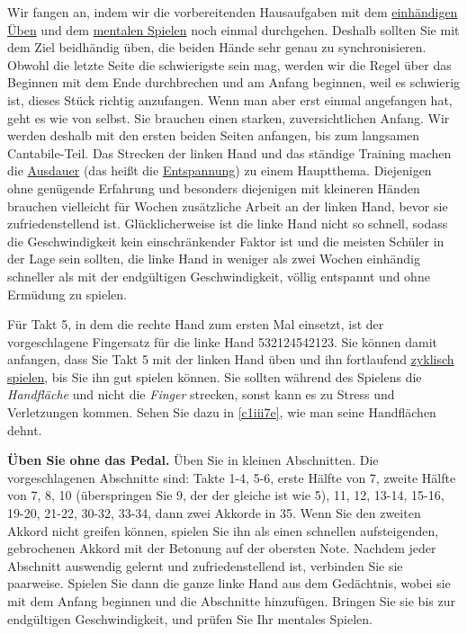 Wir fangen an, indem wir die vorbereitenden Hausaufgaben mit dem \hyperref[c1ii7]{einhändigen Üben} und dem \hyperref[c1ii12mental]{mentalen Spielen} noch einmal durchgehen.
Deshalb sollten Sie mit dem Ziel beidhändig üben, die beiden Hände sehr genau zu synchronisieren.
Obwohl die letzte Seite die schwierigste sein mag, werden wir die Regel über das Beginnen mit dem Ende durchbrechen und am Anfang beginnen, weil es schwierig ist, dieses Stück richtig anzufangen.
Wenn man aber erst einmal angefangen hat, geht es wie von selbst.
Sie brauchen einen starken, zuversichtlichen Anfang.
Wir werden deshalb mit den ersten beiden Seiten anfangen, bis zum langsamen Cantabile-Teil.
Das Strecken der linken Hand und das ständige Training machen die \hyperref[c1ii21]{Ausdauer} (das heißt die \hyperref[c1ii14]{Entspannung}) zu einem Hauptthema.
Diejenigen ohne genügende Erfahrung und besonders diejenigen mit kleineren Händen brauchen vielleicht für Wochen zusätzliche Arbeit an der linken Hand, bevor sie zufriedenstellend ist.
Glücklicherweise ist die linke Hand nicht so schnell, sodass die Geschwindigkeit kein einschränkender Faktor ist und die meisten Schüler in der Lage sein sollten, die linke Hand in weniger als zwei Wochen einhändig schneller als mit der endgültigen Geschwindigkeit, völlig entspannt und ohne Ermüdung zu spielen.

Für Takt 5, in dem die rechte Hand zum ersten Mal einsetzt, ist der vorgeschlagene Fingersatz für die linke Hand 532124542123.
Sie können damit anfangen, dass Sie Takt 5 mit der linken Hand üben und ihn fortlaufend \hyperref[c1iii2]{zyklisch spielen}, bis Sie ihn gut spielen können.
Sie sollten während des Spielens die \textit{Handfläche} und nicht die \textit{Finger} strecken, sonst kann es zu Stress und Verletzungen kommen.
Sehen Sie dazu in \hyperref[c1iii7e]{\ref*{c1iii7e}}, wie man seine Handflächen dehnt.

\textbf{Üben Sie ohne das Pedal.}
Üben Sie in kleinen Abschnitten.
Die vorgeschlagenen Abschnitte sind: Takte 1-4, 5-6, erste Hälfte von 7, zweite Hälfte von 7, 8, 10 (überspringen Sie 9, der der gleiche ist wie 5), 11, 12, 13-14, 15-16, 19-20, 21-22, 30-32, 33-34, dann zwei Akkorde in 35.
Wenn Sie den zweiten Akkord nicht greifen können, spielen Sie ihn als einen schnellen aufsteigenden, gebrochenen Akkord mit der Betonung auf der obersten Note.
Nachdem jeder Abschnitt auswendig gelernt und zufriedenstellend ist, verbinden Sie sie paarweise.
Spielen Sie dann die ganze linke Hand aus dem Gedächtnis, wobei sie mit dem Anfang beginnen und die Abschnitte hinzufügen.
Bringen Sie sie bis zur endgültigen Geschwindigkeit, und prüfen Sie Ihr mentales Spielen.


